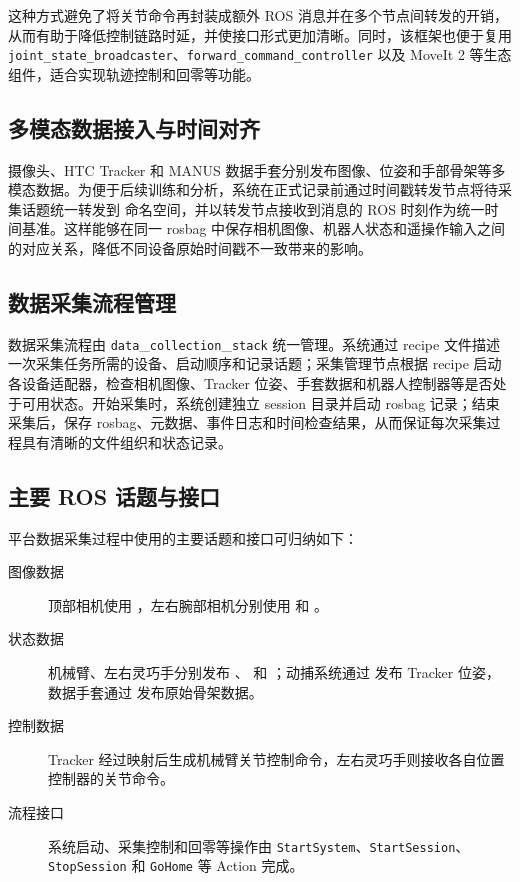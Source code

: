 这种方式避免了将关节命令再封装成额外 ROS 消息并在多个节点间转发的开销，从而有助于降低控制链路时延，并使接口形式更加清晰。同时，该框架也便于复用 \texttt{joint\_state\_broadcaster}、\texttt{forward\_command\_controller} 以及 MoveIt 2 等生态组件，适合实现轨迹控制和回零等功能。

\subsection{多模态数据接入与时间对齐}
摄像头、HTC Tracker 和 MANUS 数据手套分别发布图像、位姿和手部骨架等多模态数据。为便于后续训练和分析，系统在正式记录前通过时间戳转发节点将待采集话题统一转发到  命名空间，并以转发节点接收到消息的 ROS 时刻作为统一时间基准。这样能够在同一 rosbag 中保存相机图像、机器人状态和遥操作输入之间的对应关系，降低不同设备原始时间戳不一致带来的影响。

\subsection{数据采集流程管理}
数据采集流程由 \texttt{data}\allowbreak\_\texttt{collection}\allowbreak\_\texttt{stack} 统一管理。系统通过 recipe 文件描述一次采集任务所需的设备、启动顺序和记录话题；采集管理节点根据 recipe 启动各设备适配器，检查相机图像、Tracker 位姿、手套数据和机器人控制器等是否处于可用状态。开始采集时，系统创建独立 session 目录并启动 rosbag 记录；结束采集后，保存 rosbag、元数据、事件日志和时间检查结果，从而保证每次采集过程具有清晰的文件组织和状态记录。

\subsection{主要 ROS 话题与接口}
平台数据采集过程中使用的主要话题和接口可归纳如下：
\begin{description}
    \item[图像数据] 顶部相机使用 ，左右腕部相机分别使用  和 。
    \item[状态数据] 机械臂、左右灵巧手分别发布 、 和 ；动捕系统通过  发布 Tracker 位姿，数据手套通过  发布原始骨架数据。
    \item[控制数据] Tracker 经过映射后生成机械臂关节控制命令，左右灵巧手则接收各自位置控制器的关节命令。
    \item[流程接口] 系统启动、采集控制和回零等操作由 \texttt{StartSystem}、\texttt{StartSession}、\texttt{StopSession} 和 \texttt{GoHome} 等 Action 完成。
\end{description}
